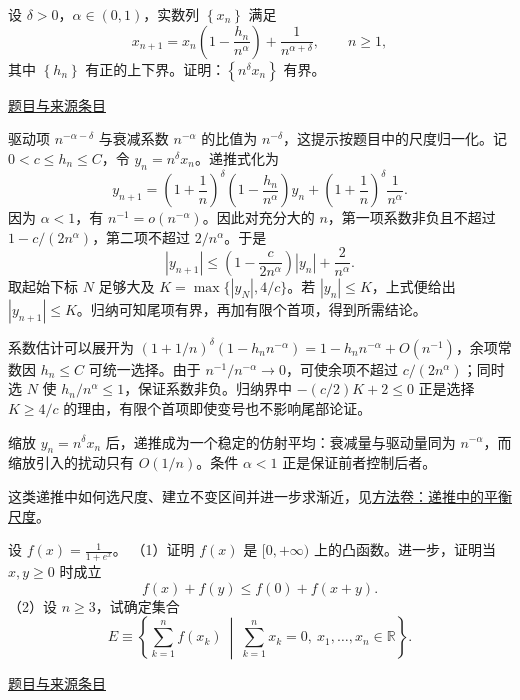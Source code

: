 \documentclass[12pt,fontset=fandol]{ctexart}
\begin{document}
\begin{example}[来源序号5]\label{ex:ch10-11th-A:5}\label{pr:ch10-11th-A:5}

设 $\delta>0$，$\alpha\in(0,1)$，实数列 $\left\{x_{n}\right\}$ 满足
\[
x_{n+1}=x_{n}\left(1-\frac{h_{n}}{n^{\alpha}}\right)+\frac{1}{n^{\alpha+\delta}},\qquad n\geq 1,
\]
其中 $\left\{h_{n}\right\}$ 有正的上下界。证明：$\left\{n^{\delta}x_{n}\right\}$ 有界。

\par\href{https://github.com/lzxcr/cmc-mathematics/blob/64916fa1fdbc3e444a652eca204d5669058ee321/src/problems/preliminary/11/05.md}{题目与来源条目}

\end{example}

\begin{solve}\label{ans:ch10-11th-A:5}

驱动项 $n^{-\alpha-\delta}$ 与衰减系数 $n^{-\alpha}$ 的比值为 $n^{-\delta}$，这提示按题目中的尺度归一化。记 $0<c\leq h_n\leq C$，令 $y_n=n^\delta x_n$。递推式化为
\[
y_{n+1}=\left(1+\frac1n\right)^\delta
\left(1-\frac{h_n}{n^\alpha}\right)y_n
+\left(1+\frac1n\right)^\delta\frac1{n^\alpha}.
\]
因为 $\alpha<1$，有 $n^{-1}=o(n^{-\alpha})$。因此对充分大的 $n$，第一项系数非负且不超过 $1-c/(2n^\alpha)$，第二项不超过 $2/n^\alpha$。于是
\[
|y_{n+1}|\leq\left(1-\frac{c}{2n^\alpha}\right)|y_n|+\frac2{n^\alpha}.
\]
取起始下标 $N$ 足够大及 $K=\max\{|y_N|,4/c\}$。若 $|y_n|\leq K$，上式便给出 $|y_{n+1}|\leq K$。归纳可知尾项有界，再加有限个首项，得到所需结论。

系数估计可以展开为 $(1+1/n)^\delta(1-h_n n^{-\alpha})=1-h_n n^{-\alpha}+O(n^{-1})$，余项常数因 $h_n\le C$ 可统一选择。由于 $n^{-1}/n^{-\alpha}\to0$，可使余项不超过 $c/(2n^\alpha)$；同时选 $N$ 使 $h_n/n^\alpha\le1$，保证系数非负。归纳界中 $-(c/2)K+2\le0$ 正是选择 $K\ge4/c$ 的理由，有限个首项即使变号也不影响尾部论证。

\end{solve}

\begin{remark}[方法与条件]缩放 $y_n=n^\delta x_n$ 后，递推成为一个稳定的仿射平均：衰减量与驱动量同为 $n^{-\alpha}$，而缩放引入的扰动只有 $O(1/n)$。条件 $\alpha<1$ 正是保证前者控制后者。

这类递推中如何选尺度、建立不变区间并进一步求渐近，见\hyperref[app:estimate-recursion]{方法卷：递推中的平衡尺度}。\end{remark}

\begin{example}[来源序号6]\label{ex:ch10-11th-A:6}\label{pr:ch10-11th-A:6}

设 $f(x)=\frac{1}{1+e^{x}}$。
（1）证明 $f(x)$ 是 $[0,+\infty)$ 上的凸函数。进一步，证明当 $x,y\geq 0$ 时成立
\[
f(x)+f(y)\leq f(0)+f(x+y).
\]
（2）设 $n\geq 3$，试确定集合
\[
E\equiv\left\{\sum_{k=1}^{n}f\left(x_{k}\right)\ \middle|\ \sum_{k=1}^{n}x_{k}=0,\ x_{1},\dots,x_{n}\in\mathbb{R}\right\}.
\]

\par\href{https://github.com/lzxcr/cmc-mathematics/blob/64916fa1fdbc3e444a652eca204d5669058ee321/src/problems/preliminary/11/06.md}{题目与来源条目}

\end{example}
\end{document}
